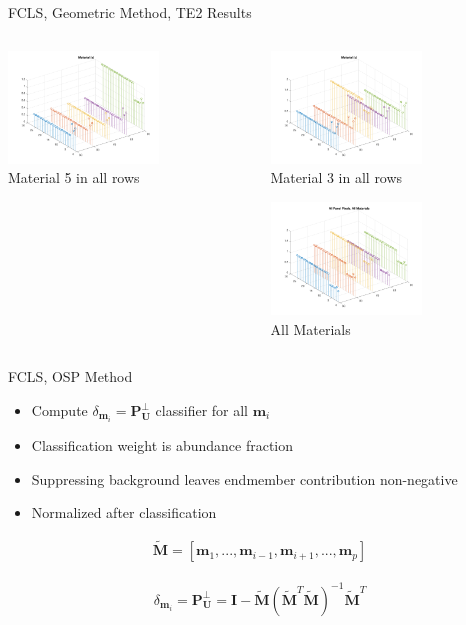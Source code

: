 \documentclass{beamer}
\begin{document}
\begin{frame}{FCLS, Geometric Method, TE2 Results}
\begin{columns}
\begin{column}{0.33\textwidth}
        \includegraphics[width=4cm,center]{gfcls_te2_material_stem_5}
        \\ Material 5 in all rows
        \centering
    \end{column}
    \begin{column}{0.33\textwidth}
        \includegraphics[width=4cm,center]{gfcls_te2_material_stem_3}
        \\ Material 3 in all rows
        \centering

        \includegraphics[width=4cm,center]{gfcls_te2_allmaterials}
        \\ All Materials
        \centering
    \end{column}
\end{columns}
\end{frame}

\begin{frame}{FCLS, OSP Method}
\begin{itemize}
    \item Compute \(\delta_{\mathbf{m}_i}=\mathbf{P}_{\mathbf{U}}^\perp\) classifier for all \(\mathbf{m}_i\)
    \item Classification weight is abundance fraction
    \item Suppressing background leaves endmember contribution non-negative
    \item Normalized after classification
\end{itemize}

\begin{align*}
\mathbf{\tilde{M}} = \left[\mathbf{m}_1,...,\mathbf{m}_{i-1}, \mathbf{m}_{i+1}, ..., \mathbf{m}_p\right]
\end{align*}

\begin{align*}
\delta_{\mathbf{m}_i}=\mathbf{P}_{\mathbf{U}}^\perp = \mathbf{I} - \mathbf{\tilde{M}}\left(\mathbf{\tilde{M}}^T\mathbf{\tilde{M}}\right)^{-1}\mathbf{\tilde{M}}^T
\end{align*}
\end{frame}
\end{document}
